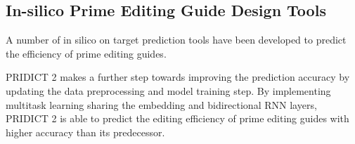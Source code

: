 \subsection*{In-silico Prime Editing Guide Design Tools}

A number of in silico on target prediction tools have been developed to predict the efficiency of prime editing guides. 

PRIDICT 2 makes a further step towards improving the prediction accuracy by updating the data preprocessing and model training step. By implementing multitask learning sharing the embedding and bidirectional RNN layers, PRIDICT 2 is able to predict the editing efficiency of prime editing guides with higher accuracy than its predecessor\cite{mathisMachineLearningPrediction2024}. 

\begin{figure}
    
\end{figure}